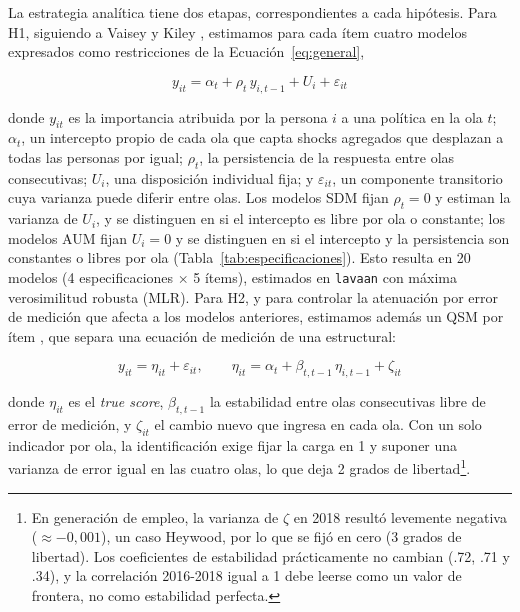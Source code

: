 \documentclass{article}
\begin{document}
La estrategia analítica tiene dos etapas, correspondientes a cada hipótesis. Para H1, siguiendo a Vaisey y Kiley \parencite*{vaisey2021}, estimamos para cada ítem cuatro modelos expresados como restricciones de la Ecuación~\ref{eq:general},

\begin{equation}
y_{it} = \alpha_t + \rho_t\, y_{i,t-1} + U_i + \varepsilon_{it}
\label{eq:general}
\end{equation}

donde $y_{it}$ es la importancia atribuida por la persona $i$ a una política en la ola $t$; $\alpha_t$, un intercepto propio de cada ola que capta shocks agregados que desplazan a todas las personas por igual; $\rho_t$, la persistencia de la respuesta entre olas consecutivas; $U_i$, una disposición individual fija; y $\varepsilon_{it}$, un componente transitorio cuya varianza puede diferir entre olas. Los modelos SDM fijan $\rho_t = 0$ y estiman la varianza de $U_i$, y se distinguen en si el intercepto es libre por ola o constante; los modelos AUM fijan $U_i = 0$ y se distinguen en si el intercepto y la persistencia son constantes o libres por ola (Tabla~\ref{tab:especificaciones}). Esto resulta en 20 modelos (4 especificaciones $\times$ 5 ítems), estimados en \texttt{lavaan} con máxima verosimilitud robusta (MLR). Para H2, y para controlar la atenuación por error de medición que afecta a los modelos anteriores, estimamos además un QSM por ítem \parencite{prior2010,wiley1970}, que separa una ecuación de medición de una estructural:

\begin{equation}
y_{it} = \eta_{it} + \varepsilon_{it}, \qquad \eta_{it} = \alpha_t + \beta_{t,t-1}\,\eta_{i,t-1} + \zeta_{it}
\label{eq:qsm}
\end{equation}

donde $\eta_{it}$ es el \textit{true score}, $\beta_{t,t-1}$ la estabilidad entre olas consecutivas libre de error de medición, y $\zeta_{it}$ el cambio nuevo que ingresa en cada ola. Con un solo indicador por ola, la identificación exige fijar la carga en 1 y suponer una varianza de error igual en las cuatro olas, lo que deja 2 grados de libertad\footnote{En generación de empleo, la varianza de $\zeta$ en 2018 resultó levemente negativa ($\approx -0{,}001$), un caso Heywood, por lo que se fijó en cero (3 grados de libertad). Los coeficientes de estabilidad prácticamente no cambian (.72, .71 y .34), y la correlación 2016-2018 igual a 1 debe leerse como un valor de frontera, no como estabilidad perfecta.}. 
\end{document}
